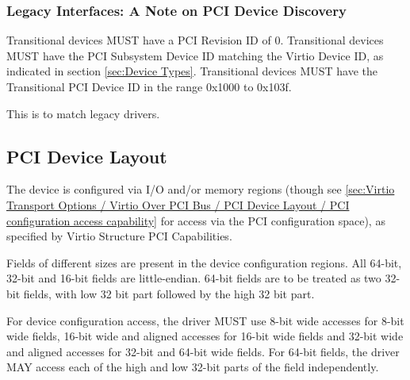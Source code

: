 \subsubsection{Legacy Interfaces: A Note on PCI Device Discovery}\label{sec:Virtio Transport Options / Virtio Over PCI Bus / PCI Device Discovery / Legacy Interfaces: A Note on PCI Device Discovery}
Transitional devices MUST have a PCI Revision ID of 0.
Transitional devices MUST have the PCI Subsystem Device ID
matching the Virtio Device ID, as indicated in section \ref{sec:Device Types}.
Transitional devices MUST have the Transitional PCI Device ID in
the range 0x1000 to 0x103f.

This is to match legacy drivers.

\subsection{PCI Device Layout}\label{sec:Virtio Transport Options / Virtio Over PCI Bus / PCI Device Layout}

The device is configured via I/O and/or memory regions (though see
\ref{sec:Virtio Transport Options / Virtio Over PCI Bus / PCI Device Layout / PCI configuration access capability}
for access via the PCI configuration space), as specified by Virtio
Structure PCI Capabilities.

Fields of different sizes are present in the device
configuration regions.
All 64-bit, 32-bit and 16-bit fields are little-endian.
64-bit fields are to be treated as two 32-bit fields,
with low 32 bit part followed by the high 32 bit part.


For device configuration access, the driver MUST use 8-bit wide
accesses for 8-bit wide fields, 16-bit wide and aligned accesses
for 16-bit wide fields and 32-bit wide and aligned accesses for
32-bit and 64-bit wide fields. For 64-bit fields, the driver MAY
access each of the high and low 32-bit parts of the field
independently.


